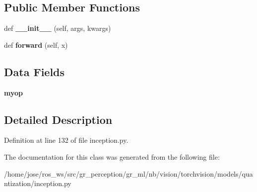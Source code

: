 \subsection*{Public Member Functions}
\begin{DoxyCompactItemize}
\item 
\mbox{\label{classtorchvision_1_1models_1_1quantization_1_1inception_1_1QuantizableInceptionD_ae4d39d224ae99da052f2753c9eaaa90f}} 
def {\bfseries \+\_\+\+\_\+init\+\_\+\+\_\+} (self, args, kwargs)
\item 
\mbox{\label{classtorchvision_1_1models_1_1quantization_1_1inception_1_1QuantizableInceptionD_a019bb6e44e5351584a34741ab99a1986}} 
def {\bfseries forward} (self, x)
\end{DoxyCompactItemize}
\subsection*{Data Fields}
\begin{DoxyCompactItemize}
\item 
\mbox{\label{classtorchvision_1_1models_1_1quantization_1_1inception_1_1QuantizableInceptionD_adefd126b156c061cef12cea2eba109aa}} 
{\bfseries myop}
\end{DoxyCompactItemize}


\subsection{Detailed Description}


Definition at line 132 of file inception.\+py.



The documentation for this class was generated from the following file\+:\begin{DoxyCompactItemize}
\item 
/home/jose/ros\+\_\+ws/src/gr\+\_\+perception/gr\+\_\+ml/nb/vision/torchvision/models/quantization/inception.\+py\end{DoxyCompactItemize}
